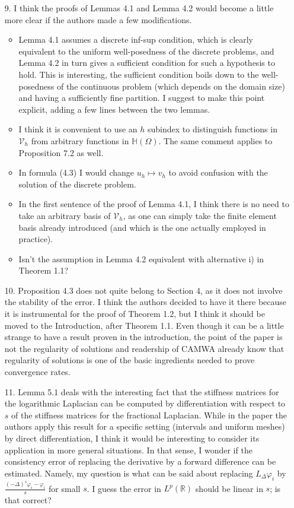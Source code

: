 \documentclass[11 pt]{article}
\numberwithin{equation}{section}
\begin{document}
\begin{enumerate}
    \item[9.] I think the proofs of Lemmas 4.1 and Lemma 4.2 would become a little more clear if the authors made a few modifications.
    \begin{itemize}
        \item Lemma 4.1 assumes a discrete inf-sup condition, which is clearly equivalent to the uniform well-posedness of the discrete problems, and Lemma 4.2 in turn gives a sufficient condition for such a hypothesis to hold. This is interesting, the sufficient condition boils down to the well-posedness of the continuous problem (which depends on the domain size) and having a sufficiently fine partition. I suggest to make this point explicit, adding a few lines between the two lemmas.
        \item I think it is convenient to use an \(h\) subindex to distinguish functions in \({\mathcal{V}}_{h}\) from arbitrary functions in \(\mathbb{H}(\Omega)\). The same comment applies to Proposition 7.2 as well.
        \item In formula (4.3) I would change \(u_{h}\mapsto v_{h}\) to avoid confusion with the solution of the discrete problem.
        \item In the first sentence of the proof of Lemma 4.1, I think there is no need to take an arbitrary basis of \({\mathcal{V}}_{h}\), as one can simply take the finite element basis already introduced (and which is the one actually employed in practice).
        \item Isn't the assumption in Lemma 4.2 equivalent with alternative i) in Theorem 1.1?
    \end{itemize}

    \item[10.] Proposition 4.3 does not quite belong to Section 4, as it does not involve the stability of the error. I think the authors decided to have it there because it is instrumental for the proof of Theorem 1.2, but I think it should be moved to the Introduction, after Theorem 1.1. Even though it can be a little strange to have a result proven in the introduction, the point of the paper is not the regularity of solutions and readership of CAMWA already know that regularity of solutions is one of the basic ingredients needed to prove convergence rates.

    \item[11.] Lemma 5.1 deals with the interesting fact that the stiffness matrices for the logarithmic Laplacian can be computed by differentiation with respect to \(s\) of the stiffness matrices for the fractional Laplacian. While in the paper the authors apply this result for a specific setting (intervals and uniform meshes) by direct differentiation, I think it would be interesting to consider its application in more general situations. In that sense, I wonder if the consistency error of replacing the derivative by a forward difference can be estimated. Namely, my question is what can be said about replacing \(L_{\Delta}\varphi_{i}\) by \(\frac{(-\Delta)^{s}\varphi_{i}-\varphi_{i}}{s}\) for small \(s\). I guess the error in \(L^{p}(\mathbb{R})\) should be linear in \(s\); is that correct?


\end{enumerate}
\end{document}

